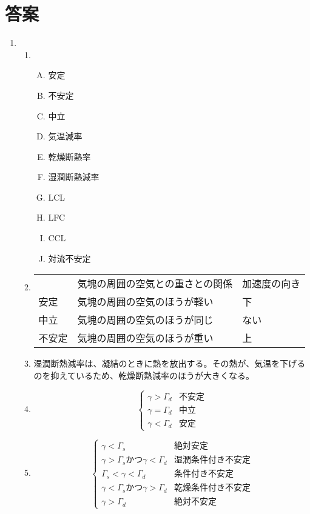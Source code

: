 \documentclass{jsarticle}
\newenvironment{problems}
{
  \renewcommand\labelenumi{\doublebox{\arabic{enumi}}}
  \begin{enumerate}
}{
  \end{enumerate}
  \renewcommand\labelenumi{\arabic{enumi}.}
}
\begin{document}
\section{答案}
\begin{problems}
\item 
	\begin{enumerate}[(1)]
  \item
  	\begin{enumerate}[(A)]
    \item 安定
    \item 不安定
    \item 中立
    \item 気温減率
    \item 乾燥断熱率
    \item 湿潤断熱減率
    \item LCL
    \item LFC
    \item CCL
    \item 対流不安定
    \end{enumerate}

\item

\begin{table}[H]
\begin{tabular}{lll}
    & 気塊の周囲の空気との重さとの関係 & 加速度の向き \\
安定  & 気塊の周囲の空気のほうが軽い   & 下      \\
中立  & 気塊の周囲の空気のほうが同じ   & ない    \\
不安定 & 気塊の周囲の空気のほうが重い   & 上     
\end{tabular}
\end{table}
  \item
湿潤断熱減率は、凝結のときに熱を放出する。その熱が、気温を下げるのを抑えているため、乾燥断熱減率のほうが大きくなる。
  \item
  \begin{equation}
  \begin{cases}
    \gamma > \Gamma_d & 不安定\\
  \gamma = \Gamma_d & 中立\\
  \gamma < \Gamma_d & 安定
  \end{cases}
  \end{equation}
\item
  \begin{equation}
  \begin{cases}
    \gamma < \Gamma_s & 絶対安定\\
    \gamma > \Gamma_s かつ\gamma < \Gamma_d & 湿潤条件付き不安定\\
  \Gamma_s < \gamma < \Gamma_d & 条件付き不安定\\
  \gamma < \Gamma_s かつ \gamma > \Gamma_d & 乾燥条件付き不安定\\
  \gamma > \Gamma_d & 絶対不安定
  \end{cases}
  \end{equation}


\end{enumerate}
\end{problems}
\end{document}
